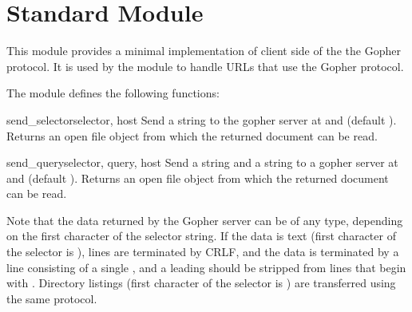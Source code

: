 \section{Standard Module }
\label{module-gopherlib}

\renewcommand{\indexsubitem}{(in module gopherlib)}

This module provides a minimal implementation of client side of the
the Gopher protocol.  It is used by the module  to handle
URLs that use the Gopher protocol.

The module defines the following functions:

\begin{funcdesc}{send_selector}{selector, host}
Send a  string to the gopher server at  and
 (default ).  Returns an open file object from
which the returned document can be read.
\end{funcdesc}

\begin{funcdesc}{send_query}{selector, query, host}
Send a  string and a  string to a gopher
server at  and  (default ).  Returns an
open file object from which the returned document can be read.
\end{funcdesc}

Note that the data returned by the Gopher server can be of any type,
depending on the first character of the selector string.  If the data
is text (first character of the selector is ), lines are
terminated by CRLF, and the data is terminated by a line consisting of
a single , and a leading  should be stripped from
lines that begin with .  Directory listings (first character
of the selector is ) are transferred using the same protocol.
